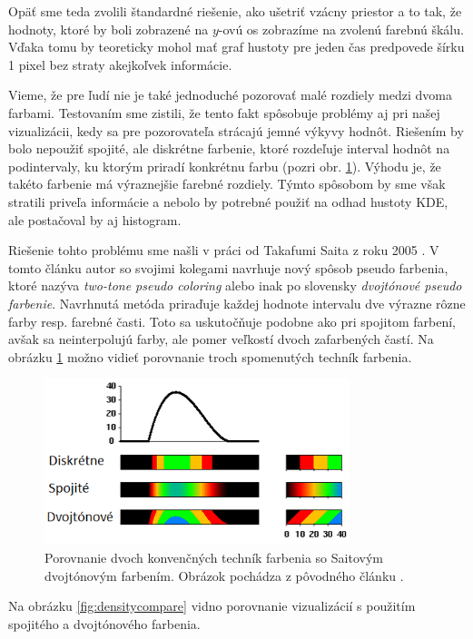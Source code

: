 Opäť sme teda zvolili štandardné riešenie, ako ušetriť vzácny priestor a to tak, že hodnoty, ktoré by boli zobrazené na $ y $-ovú os zobrazíme na zvolenú farebnú škálu. Vďaka tomu by teoreticky mohol mať graf hustoty pre jeden čas predpovede šírku 1 pixel bez straty akejkoľvek informácie.

Vieme, že pre ľudí nie je také jednoduché pozorovať malé rozdiely medzi dvoma farbami. Testovaním sme zistili, že tento fakt spôsobuje problémy aj pri našej vizualizácii, kedy sa pre pozorovateľa strácajú jemné výkyvy hodnôt. Riešením by bolo nepoužiť spojité, ale diskrétne farbenie, ktoré rozdeľuje interval hodnôt na podintervaly, ku ktorým priradí konkrétnu farbu (pozri obr. \ref{fig:twotone}). Výhodu je, že takéto farbenie má výraznejšie farebné rozdiely. Týmto spôsobom by sme však stratili priveľa informácie a nebolo by potrebné použiť na odhad hustoty KDE, ale postačoval by aj histogram. 

Riešenie tohto problému sme našli v práci od Takafumi Saita z roku 2005 \cite{Saito}. V tomto článku autor so svojimi kolegami navrhuje nový spôsob pseudo farbenia, ktoré nazýva \textit{two-tone pseudo coloring} alebo inak po slovensky \textit{dvojtónové pseudo farbenie}. Navrhnutá metóda priraďuje každej hodnote intervalu dve výrazne rôzne farby resp. farebné časti. Toto sa uskutočňuje podobne ako pri spojitom farbení, avšak sa neinterpolujú farby, ale pomer veľkostí dvoch zafarbených častí. Na obrázku \ref{fig:twotone} možno vidieť porovnanie troch spomenutých techník farbenia.

\begin{figure}
	\centering
	\includegraphics[width = 3.5in]{twotone}
	\caption{Porovnanie dvoch konvenčných techník farbenia so Saitovým dvojtónovým farbením. Obrázok pochádza z pôvodného článku \cite{Saito}. }
	\label{fig:twotone} 
\end{figure}


Na obrázku \ref{fig:densitycompare} vidno porovnanie vizualizácií s použitím spojitého a dvojtónového farbenia.

